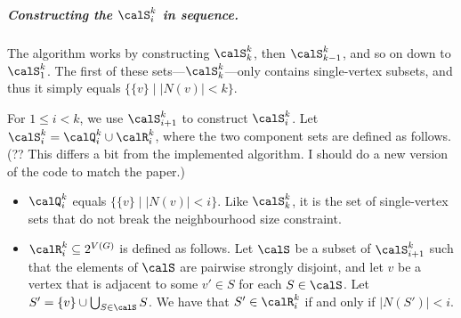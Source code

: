 \subparagraph*{Constructing the $\calS_i^k$ in sequence.}
The algorithm works by constructing $\calS_k^k$, then $\calS_{k-1}^k$, and so on down to $\calS_1^k$.
The first of these sets---$\calS_k^k$---only contains single-vertex subsets, and
thus it simply equals $\{\{v\} \mid |N(v)| < k\}$.

For $1 \leq i < k$, we use $\calS_{i+1}^k$ to construct $\calS_i^k$.
Let $\calS_i^k = \calQ_i^k \cup \calR_i^k$, where the two component sets are defined
as follows.  (?? This differs a bit from the implemented algorithm.  I should do a new version of
the code to match the paper.)

\begin{itemize}
  \item $\calQ_i^k$ equals $\{\{v\} \mid |N(v)| < i\}$.  Like $\calS_k^k$, it is the set of single-vertex
    sets that do not break the neighbourhood size constraint.
  \item $\calR_i^k \subseteq 2^{V(G)}$ is defined as follows.  Let $\calS$ be a subset
    of $\calS_{i+1}^k$ such that the elements of $\calS$ are pairwise
    strongly disjoint, and let $v$ be a vertex
    that is adjacent to some $v' \in S$ for each $S \in \calS$.  Let $S' = \{v\} \cup \bigcup_{S \in \calS} S$.
    We have that $S' \in \calR_i^k$ if and only if $|N(S')| < i$.
\end{itemize}

